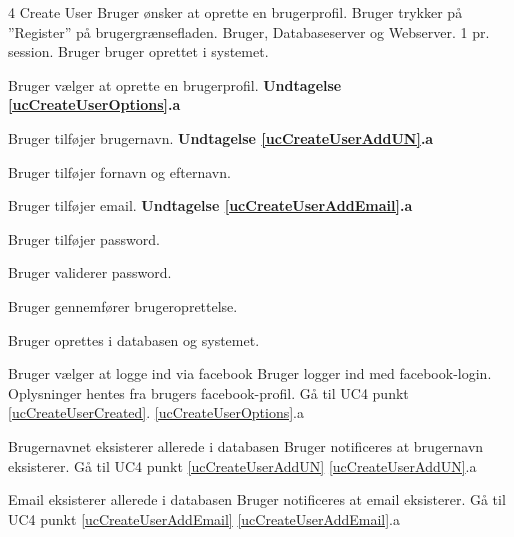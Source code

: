 
\uchead
	{4}
	{Create User}
	{Bruger ønsker at oprette en brugerprofil.}
	{Bruger trykker på ''Register'' på brugergrænsefladen.}
	{Bruger, Databaseserver og Webserver.}
	{}
	{1 pr. session.}
	{Bruger bruger oprettet i systemet.}

\item \label{ucCreateUserOptions} Bruger vælger at oprette en brugerprofil. \newline
\textbf{Undtagelse \ref{ucCreateUserOptions}.a}

\item \label{ucCreateUserAddUN} Bruger tilføjer brugernavn.
\textbf{Undtagelse \ref{ucCreateUserAddUN}.a}

\item Bruger tilføjer fornavn og efternavn.

\item \label{ucCreateUserAddEmail} Bruger tilføjer email.
\textbf{Undtagelse \ref{ucCreateUserAddEmail}.a}

\item Bruger tilføjer password.

\item Bruger validerer password.

\item Bruger gennemfører brugeroprettelse.

\item \label{ucCreateUserCreated} Bruger oprettes i databasen og systemet.

\ucdescriptionend


\ucextension
	{Bruger vælger at logge ind via facebook}
	{Bruger logger ind med facebook-login. \newline
	\indent Oplysninger hentes fra brugers facebook-profil. \newline
	\indent Gå til UC4 punkt \ref{ucCreateUserCreated}.
	}
	{\ref{ucCreateUserOptions}.a}

	
	
\ucextension
	{Brugernavnet eksisterer allerede i databasen}
	{Bruger notificeres at brugernavn eksisterer.\newline
	Gå til UC4 punkt \ref{ucCreateUserAddUN}}
	{\ref{ucCreateUserAddUN}.a}
	


\ucextension
	{Email eksisterer allerede i databasen}
	{Bruger notificeres at email eksisterer.\newline
	Gå til UC4 punkt \ref{ucCreateUserAddEmail}}
	{\ref{ucCreateUserAddEmail}.a}
		
